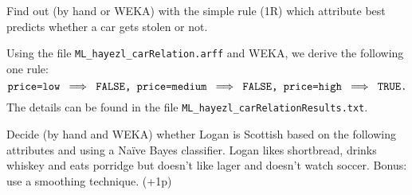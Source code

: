 \documentclass[fontsize=12pt, usenames, dvipsnames, headinclude, headsepline, footinclude, footsepline]{scrartcl}
\title{\normalfont{\bfseries{Machine Learning: Homework 2}}}
\author{Laurent \textsc{Hayez}}
\date{\today}
\begin{document}
\renewcommand{\labelitemi}{\textbullet}



\maketitle




\begin{exo}
  Find out (by hand or WEKA) with the simple rule (1R) which attribute best predicts whether a car gets stolen or not.
\end{exo}

  \begin{sol}
    Using the file \texttt{ML\_hayezl\_carRelation.arff} and WEKA, we derive the following one rule:
    \[ \text{\texttt{price=low $\implies$ FALSE, price=medium $\implies$ FALSE, price=high $\implies$
          TRUE.}} \]
    The details can be found in the file \texttt{ML\_hayezl\_carRelationResults.txt}.
  \end{sol}




\begin{exo}
  Decide (by hand and WEKA) whether Logan is Scottish based on the following attributes and using a Naïve
  Bayes classifier. Logan likes shortbread, drinks whiskey and eats porridge but doesn’t like lager and
  doesn’t watch soccer. Bonus: use a smoothing technique. (+1p)
\end{exo}
\end{document}
